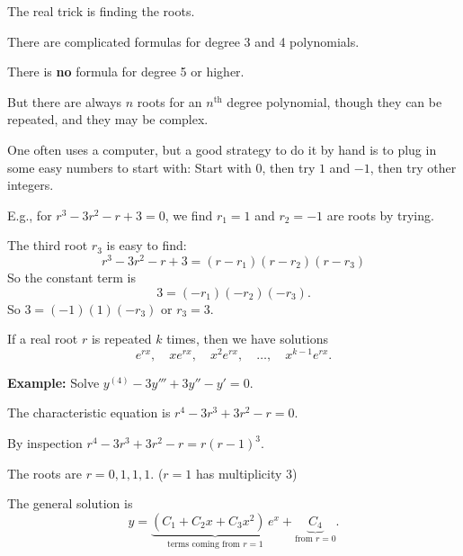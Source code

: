 \documentclass[10pt,aspectratio=169]{beamer}
\begin{document}
\begin{frame}
The real trick is finding the roots.

\medskip
\pause

There are complicated formulas for degree
3 and 4 polynomials.

\medskip
\pause

There is \textbf{no} formula for degree 5 or higher.

\medskip
\pause

But there are always $n$ roots for an 
$n^{\text{th}}$ degree polynomial,
though they can be repeated, and they may be complex.

\medskip
\pause

One often uses a computer, but a good strategy to do it by hand is
to plug in some easy numbers to start with:
Start with $0$, then try $1$ and $-1$, then try other integers.

\medskip
\pause

E.g., for $r^3 - 3 r^2 - r + 3 = 0$, we find $r_1 = 1$ and $r_2 = -1$ are
roots by trying.

\pause
The third root $r_3$ is easy to find:
\pause
\[
r^3 - 3 r^2 - r + 3 = (r-r_1)(r-r_2)(r-r_3)
\]
\pause
So the constant term is
\[
3 = (-r_1)(-r_2)(-r_3) .
\]
\pause
So $3 = (-1)(1)(-r_3)$ or $r_3 = 3$.

\end{frame}

\begin{frame}
If a real root $r$
is repeated $k$ times, then we have solutions
\[
e^{rx}, \quad xe^{rx}, \quad x^2 e^{rx}, \quad \ldots, \quad x^{k-1} e^{rx} .
\]

\pause
\textbf{Example:}
Solve $y^{(4)} - 3 y''' + 3 y'' - y' =  0$.

\medskip
\pause

The characteristic equation is \quad $r^4 - 3r^3 + 3r^2 -r = 0$.

\medskip
\pause

By inspection \quad $r^4 - 3r^3 + 3r^2 -r = r{(r-1)}^3$.

\medskip
\pause

The roots are $r = 0, 1, 1, 1$. \quad ($r=1$ has multiplicity $3$)

\medskip
\pause

The general solution is
\[
y = \underbrace{(C_1 + C_2 x + C_3 x^2)\, e^x}_{\text{terms coming from }
r=1} + \underbrace{C_4}_{\text{from } r=0} .
\]

\end{frame}
\end{document}
